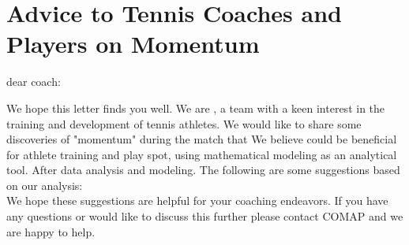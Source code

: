\section{Advice to Tennis Coaches and Players on Momentum}

dear coach:

We hope this letter finds you well. We are , a team with a keen interest in the training and development of tennis 
athletes. We would like to share some discoveries of "momentum" during the match that We believe could be beneficial 
for athlete training and play spot, using mathematical modeling as an analytical tool. After data analysis and modeling. 
The following are some suggestions based on our analysis:\\


We hope these suggestions are helpful for your coaching endeavors. 
If you have any questions or would like to discuss this further please contact
COMAP and we are happy to help.